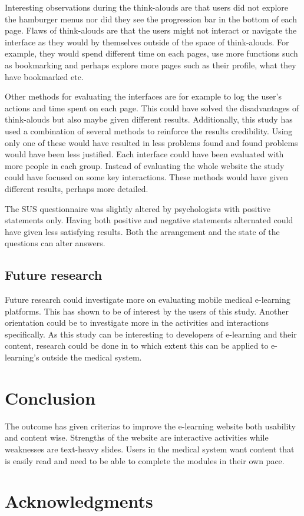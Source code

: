 \documentclass{sigchi}
\begin{document}
Interesting observations during the think-alouds are that users did not explore the hamburger menus nor did they see the progression bar in the bottom of each page. Flaws of think-alouds are that the users might not interact or navigate the interface as they would by themselves outside of the space of think-alouds. For example, they would spend different time on each pages, use more functions such as bookmarking and perhaps explore more pages such as their profile, what they have bookmarked etc.

Other methods for evaluating the interfaces are for example to log the user's actions and time spent on each page. This could have solved the disadvantages of think-alouds but also maybe given different results. Additionally, this study has used a combination of several methods to reinforce the results credibility. Using only one of these would have resulted in less problems found and found problems would have been less justified. Each interface could have been evaluated with more people in each group. Instead of evaluating the whole website the study could have focused on some key interactions. These methods would have given different results, perhaps more detailed. 

The SUS questionnaire was slightly altered by psychologists with positive statements only. Having both positive and negative statements alternated could have given less satisfying results. Both the arrangement and the state of the questions can alter answers.

\subsection{Future research}
Future research could investigate more on evaluating mobile medical e-learning platforms. This has shown to be of interest by the users of this study. Another orientation could be to investigate more in the activities and interactions specifically. As this study can be interesting to developers of e-learning and their content, research could be done in to which extent this can be applied to e-learning's outside the medical system.

\section{Conclusion}
The outcome has given criterias to improve the e-learning website both usability and content wise. Strengths of the website are interactive activities while weaknesses are text-heavy slides. Users in the medical system want content that is easily read and need to be able to complete the modules in their own pace. 
 
\section{Acknowledgments}

\balance{}



\end{document}
